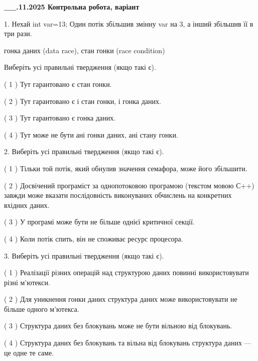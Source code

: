 \documentclass[12pt, ukrainian]{article}
\begin{document}
\newpage
\begin {large}

\textbf{\_\_.11.2025 Контрольна робота, варіант  }\par


{
1. Нехай int var=13; Один потік збільшив змінну var на 3, а інший збільшив її в три рази.

гонка даних (data race), стан гонки (race condition)

Виберіть усі правильні твердження (якщо такі є).\par
\vspace{2mm}
( 1 ) Тут гарантовано є стан гонки.%

( 2 ) Тут гарантовано є і стан гонки, і гонка даних.%

( 3 ) Тут гарантовано є гонка даних.%

( 4 ) Тут може не бути ані гонки даних, ані стану гонки.%


2. Виберіть усі правильні твердження (якщо такі є).\par
\vspace{2mm}

( 1 ) Тільки той потік, який обнулив значення семафора, може його збільшити.%

( 2 ) Досвічений програміст за однопотоковою програмою (текстом мовою С++) завжди може вказати послідовність виконуваних обчислень на конкретних вхідних даних.%

( 3 ) У програмі може бути не більше однієї критичної секції.%

( 4 ) Коли потік спить, він не споживає ресурс процесора.%


3. Виберіть усі правильні твердження (якщо такі є).\par
\vspace{2mm}

( 1 ) Реалізації різних операцій над структурою даних повинні використовувати різні м’ютекси.%

( 2 ) Для уникнення гонки даних структура даних може використовувати не більше одного м’ютекса.%

( 3 ) Структура даних без блокувань може не бути вільною від блокувань.%

( 4 ) Структура даних без блокувань та вільна від блокувань структура даних --- це одне те саме.%


}
\end{large}
\end{document}
